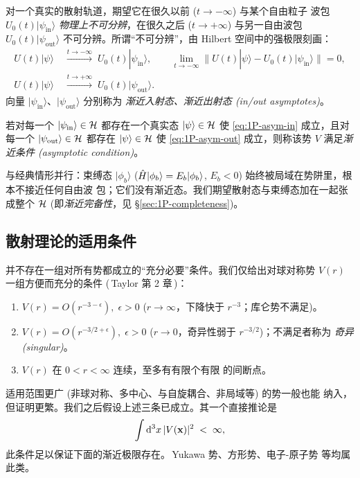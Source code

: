 对一个真实的散射轨道，期望它在很久以前 ($t\to-\infty$) 与某个自由粒子
波包 $U_0(t)|\psi_{\text{in}}\rangle$ \emph{物理上不可分辨}，在很久之后
($t\to+\infty$) 与另一自由波包 $U_0(t)|\psi_{\text{out}}\rangle$
不可分辨。所谓“不可分辨”，由 Hilbert 空间中的强极限刻画：
\begin{align}
  U(t)|\psi\rangle \;&\xrightarrow{t\to-\infty}\; U_0(t)|\psi_{\text{in}}\rangle,
  \qquad
  \lim_{t\to-\infty}\bigl\| U(t)|\psi\rangle - U_0(t)|\psi_{\text{in}}\rangle \bigr\| = 0,
  \label{eq:1P-asym-in}\\
  U(t)|\psi\rangle \;&\xrightarrow{t\to+\infty}\; U_0(t)|\psi_{\text{out}}\rangle.
  \label{eq:1P-asym-out}
\end{align}
向量 $|\psi_{\text{in}}\rangle$、$|\psi_{\text{out}}\rangle$ 分别称为
\emph{渐近入射态、渐近出射态 (in/out asymptotes)}。

\begin{definition}[渐近条件]
\label{def:1P-asymCond}
若对每一个 $|\psi_{\text{in}}\rangle\in\mathcal{H}$ 都存在一个真实态
$|\psi\rangle\in\mathcal{H}$ 使 \eqref{eq:1P-asym-in} 成立，且对每一个
$|\psi_{\text{out}}\rangle\in\mathcal{H}$ 都存在 $|\psi\rangle\in\mathcal{H}$ 使
\eqref{eq:1P-asym-out} 成立，则称该势 $V$ 满足\emph{渐近条件
(asymptotic condition)}。
\end{definition}

\begin{remark}[渐近态与束缚态]
与经典情形并行：束缚态 $|\phi_b\rangle$ ($\hat{H}|\phi_b\rangle =
E_b|\phi_b\rangle$, $E_b<0$) 始终被局域在势阱里，根本不接近任何自由波
包；它们没有渐近态。我们期望散射态与束缚态加在一起张成整个 $\mathcal{H}$
(即\emph{渐近完备性}，见 \S\ref{sec:1P-completeness})。
\end{remark}

\subsection{散射理论的适用条件}
\label{ssec:1P-conditions}

并不存在一组对所有势都成立的“充分必要”条件。我们仅给出对球对称势
$V(r)$ 一组方便而充分的条件 (\,Taylor 第 2 章\,)：
\begin{enumerate}
  \item[\textbf{(I)}] $V(r)=O(r^{-3-\epsilon}),\;\epsilon>0$ \quad
        ($r\to\infty$，下降快于 $r^{-3}$；库仑势不满足)。
  \item[\textbf{(II)}] $V(r)=O(r^{-3/2+\epsilon}),\;\epsilon>0$ \quad
        ($r\to 0$，奇异性弱于 $r^{-3/2}$)；不满足者称为
        \emph{奇异 (singular)}。
  \item[\textbf{(III)}] $V(r)$ 在 $0<r<\infty$ 连续，至多有有限个有限
        的间断点。
\end{enumerate}
适用范围更广 (非球对称、多中心、与自旋耦合、非局域等) 的势一般也能
纳入，但证明更繁。我们之后假设上述三条已成立。其一个直接推论是
\begin{equation}
  \int \mathrm{d}^3x\,|V(\mathbf{x})|^2 \;<\;\infty,
  \label{eq:1P-V-L2}
\end{equation}
此条件足以保证下面的渐近极限存在。\,Yukawa 势、方形势、电子-原子势
等均属此类。


